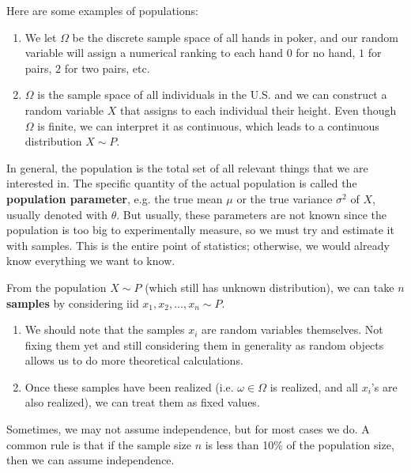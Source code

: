 \documentclass{article}
\begin{document}
    \begin{example}[Populations]
      Here are some examples of populations: 
      \begin{enumerate}
        \item We let $\Omega$ be the discrete sample space of all hands in poker, and our random variable will assign a numerical ranking to each hand $0$ for no hand, $1$ for pairs, $2$ for two pairs, etc. 
        \item $\Omega$ is the sample space of all individuals in the U.S. and we can construct a random variable $X$ that assigns to each individual their height. Even though $\Omega$ is finite, we can interpret it as continuous, which leads to a continuous distribution $X \sim P$. 
      \end{enumerate}
    \end{example}

    In general, the population is the total set of all relevant things that we are interested in. The specific quantity of the actual population is called the \textbf{population parameter}, e.g. the true mean $\mu$ or the true variance $\sigma^2$ of $X$, usually denoted with $\theta$. But usually, these parameters are not known since the population is too big to experimentally measure, so we must try and estimate it with samples. This is the entire point of statistics; otherwise, we would already know everything we want to know. 

    \begin{definition}[Samples]
      From the population $X \sim P$ (which still has unknown distribution), we can take $n$ \textbf{samples} by considering iid $x_1, x_2, \ldots, x_n \sim P$. 
      \begin{enumerate}
        \item We should note that the samples $x_i$ are random variables themselves. Not fixing them yet and still considering them in generality as random objects allows us to do more theoretical calculations. 
        \item Once these samples have been realized (i.e. $\omega \in \Omega$ is realized, and all $x_i$'s are also realized), we can treat them as fixed values. 
      \end{enumerate}
      Sometimes, we may not assume independence, but for most cases we do. A common rule is that if the sample size $n$ is less than 10\% of the population size, then we can assume independence. 
    \end{definition}
\end{document}

